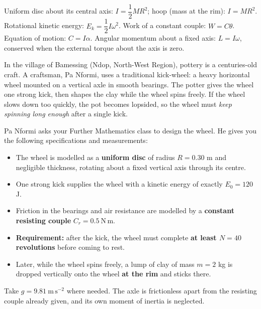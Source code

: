 \documentclass[11pt]{article}
\newcounter{popsec}
\newcounter{popsub}
\newcommand{\courssub}[1]{%
  \stepcounter{popsub}%
  \par\vspace{9pt}\noindent{\popxbold\fontsize{11.5}{13}\selectfont\color{popink}{\color{poporange}\thepopsec.\thepopsub}\hspace{6pt}#1}\par\nopagebreak\vspace{4pt}
}
\begin{document}
\begin{aretenir}
Uniform disc about its central axis: $I=\dfrac12 MR^2$; hoop (mass at the rim): $I=MR^2$. Rotational kinetic energy: $E_k=\dfrac12 I\omega^2$. Work of a constant couple: $W=C\theta$. Equation of motion: $C=I\alpha$. Angular momentum about a fixed axis: $L=I\omega$, conserved when the external torque about the axis is zero.
\end{aretenir}

\courssub{Situation}

\begin{experience}
In the village of Bamessing (Ndop, North-West Region), pottery is a centuries-old craft. A craftsman, Pa Nformi, uses a traditional kick-wheel: a heavy horizontal wheel mounted on a vertical axle in smooth bearings. The potter gives the wheel one strong kick, then shapes the clay while the wheel spins freely. If the wheel slows down too quickly, the pot becomes lopsided, so the wheel must \emph{keep spinning long enough} after a single kick.

Pa Nformi asks your Further Mathematics class to design the wheel. He gives you the following specifications and measurements:

\begin{itemize}
\item The wheel is modelled as a \textbf{uniform disc} of radius $R=0.30$ m and negligible thickness, rotating about a fixed vertical axis through its centre.
\item One strong kick supplies the wheel with a kinetic energy of exactly $E_0=120$ J.
\item Friction in the bearings and air resistance are modelled by a \textbf{constant resisting couple} $C_r=0.5\ \mathrm{N\,m}$.
\item \textbf{Requirement:} after the kick, the wheel must complete \textbf{at least $N=40$ revolutions} before coming to rest.
\item Later, while the wheel spins freely, a lump of clay of mass $m=2$ kg is dropped vertically onto the wheel \textbf{at the rim} and sticks there.
\end{itemize}

Take $g=9.81\ \mathrm{m\,s^{-2}}$ where needed. The axle is frictionless apart from the resisting couple already given, and its own moment of inertia is neglected.
\end{experience}
\end{document}
